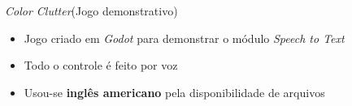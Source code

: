 \begin{frame}{\textit{Color Clutter}}{(Jogo demonstrativo)}

\begin{itemize}
\item Jogo criado em \textit{Godot} para demonstrar o módulo \textit{Speech to Text}
\item Todo o controle é feito por voz
\item Usou-se \textbf{inglês americano} pela disponibilidade de arquivos
\end{itemize}

\end{frame}
